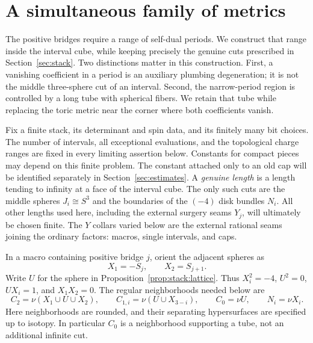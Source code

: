 \section{A simultaneous family of metrics}
\label{sec:geometry}

The positive bridges require a range of self-dual periods.  We construct
that range inside the interval cube, while keeping precisely the genuine
cuts prescribed in Section~\ref{sec:stack}.  Two distinctions matter in this
construction.  First, a vanishing coefficient in a period is an auxiliary
plumbing degeneration; it is not the middle three-sphere cut of an
interval.  Second, the narrow-period region is controlled by a long tube
with spherical fibers.  We retain that tube while replacing the toric
metric near the corner where both coefficients vanish.

Fix a finite stack, its determinant and spin data, and its finitely many
bit choices.  The number of intervals, all exceptional evaluations, and
the topological charge ranges are fixed in every limiting assertion below.
Constants for compact pieces may depend on this finite problem.  The
constant attached only to an old cap will be identified separately in
Section~\ref{sec:estimates}.  A \emph{genuine length} is a length tending to
infinity at a face of the interval cube.  The only such cuts are the
middle spheres $J_i\cong S^3$ and the boundaries of the $(-4)$ disk bundles
$N_i$.  All other lengths used here, including the external surgery seams
$Y_j$, will ultimately be chosen finite.  The $Y$ collars varied below
are the external rational seams joining the ordinary factors: macros,
single intervals, and caps.

In a macro containing positive bridge $j$, orient the adjacent spheres as
\begin{equation}
 X_1=-S_j,\qquad X_2=S_{j+1}.
 \label{eq:geometry:oriented-spheres}
\end{equation}
Write $U$ for the sphere in Proposition~\ref{prop:stack:lattice}.  Thus
$X_i^2=-4$, $U^2=0$, $U X_i=1$, and $X_1X_2=0$.  The regular neighborhoods
needed below are
\begin{equation}
 C_2=\nu(X_1\cup U\cup X_2),\qquad
 C_{1,i}=\nu(U\cup X_{3-i}),\qquad C_0=\nu U,\qquad N_i=\nu X_i.
 \label{eq:geometry:neighborhoods}
\end{equation}
Here neighborhoods are rounded, and their separating hypersurfaces are
specified up to isotopy.  In particular $C_0$ is a neighborhood supporting
a tube, not an additional infinite cut.

